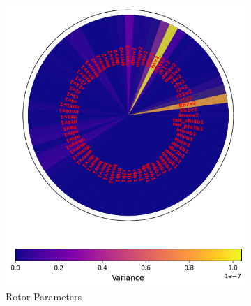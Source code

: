 \documentclass{report} %
\begin{document}
\begin{figure}[H]
    \centering
    \begin{subfigure}{0.32\textwidth}
        \centering
        \includegraphics[width=\textwidth]{./ReportImages/rotor_params.png}
        \caption{Rotor Parameters}
        \label{subfig:Rotor Parameters}
    \end{subfigure}\hfill
    \begin{subfigure}{0.32\textwidth}
        \centering

\end{subfigure}
\end{figure}
\end{document}
